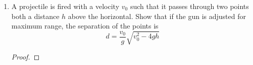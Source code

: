 \documentclass[../psets.tex]{subfiles}
\begin{document}
\begin{enumerate}
\begin{enumerate}
\begin{proof}
\begin{align*}
                &= 0
            \end{align*}
            Since the curl vanishes, the force \par
            Thus, we can calculate the potential energy $V(\vec{r})$ as follows.
            \begin{align*}
                V(\vec{r}) &= -\int_1^{\vec{r}}\vec{F}\cdot\dd\vec{r}'\\
                &= -\int_1^{|\vec{r}|}\frac{a}{r'}\dd{r'}\\
                \Aboxed{V(\vec{r}) &= -a\ln(|\vec{r}|)}
            \end{align*}
        \end{proof}
    \end{enumerate}
    \item A projectile is fired with a velocity $v_0$ such that it passes through two points both a distance $h$ above the horizontal. Show that if the gun is adjusted for maximum range, the separation of the points is
    \begin{equation*}
        d = \frac{v_0}{g}\sqrt{v_0^2-4gh}
    \end{equation*}
    \begin{proof}

\end{proof}
\end{enumerate}
\end{document}
